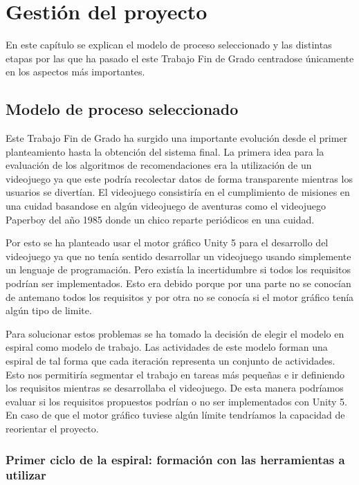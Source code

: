 \chapter{Gestión del proyecto}

En este capítulo se explican el modelo de proceso seleccionado y las distintas etapas por las que ha pasado el este Trabajo Fin de Grado centradose únicamente en los aspectos más importantes.

\section{Modelo de proceso seleccionado}


Este Trabajo Fin de Grado ha surgido una importante evolución desde el primer planteamiento hasta la obtención del sistema final. La primera idea para la evaluación de los algoritmos de recomendaciones era la utilización de un videojuego ya que este podría recolectar datos de forma transparente mientras los usuarios se divertían. El videojuego consistiría en el cumplimiento de misiones en una cuidad basandose en algún videojuego de aventuras como el videojuego Paperboy del año 1985 donde un chico reparte periódicos en una cuidad.

Por esto se ha planteado usar el motor gráfico Unity 5 para el desarrollo del videojuego ya que no tenía sentido desarrollar un videojuego usando simplemente un lenguaje de programación. Pero existía la incertidumbre si todos los requisitos podrían ser implementados. Esto era debido porque por una parte no se conocían de antemano todos los requisitos y por otra no se conocía si el motor gráfico tenía algún tipo de limite. 

Para solucionar estos problemas se ha tomado la decisión de elegir el modelo en espiral como modelo de trabajo. Las actividades de este modelo forman una espiral de tal forma que cada iteración representa un conjunto de actividades. Esto nos permitiría segmentar el trabajo en tareas más pequeñas e ir definiendo los requisitos mientras se desarrollaba el videojuego. De esta manera podríamos evaluar si los requisitos propuestos podrían o no ser implementados con Unity 5. En caso de que el motor gráfico tuviese algún límite tendríamos la capacidad de reorientar el proyecto.

\subsection{Primer ciclo de la espiral: formación con las herramientas a utilizar}

